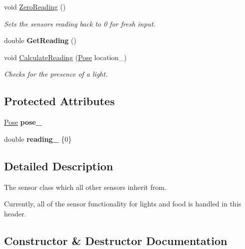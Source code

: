 \begin{DoxyCompactItemize}
\item 
void \hyperlink{classSensor_a2d3fbd7ba1b1dbbe4b3916aa8ce538ea}{Zero\+Reading} ()\hypertarget{classSensor_a2d3fbd7ba1b1dbbe4b3916aa8ce538ea}{}\label{classSensor_a2d3fbd7ba1b1dbbe4b3916aa8ce538ea}

\begin{DoxyCompactList}\small\item\em Sets the sensor\textquotesingle{}s reading back to 0 for fresh input. \end{DoxyCompactList}\item 
double {\bfseries Get\+Reading} ()\hypertarget{classSensor_a70a1a78b3875502d3a2e7a7ba2416903}{}\label{classSensor_a70a1a78b3875502d3a2e7a7ba2416903}

\item 
void \hyperlink{classSensor_a11136e330f87ec24deb0b8dc0abb7824}{Calculate\+Reading} (\hyperlink{structPose}{Pose} location\+\_\+)
\begin{DoxyCompactList}\small\item\em Checks for the presence of a light. \end{DoxyCompactList}\end{DoxyCompactItemize}
\subsection*{Protected Attributes}
\begin{DoxyCompactItemize}
\item 
\hyperlink{structPose}{Pose} {\bfseries pose\+\_\+}\hypertarget{classSensor_ad060f21909f3e4f5dfd310cb2fa52000}{}\label{classSensor_ad060f21909f3e4f5dfd310cb2fa52000}

\item 
double {\bfseries reading\+\_\+} \{0\}\hypertarget{classSensor_ad71b1c465eae9ddf1da31cff1cbe3736}{}\label{classSensor_ad71b1c465eae9ddf1da31cff1cbe3736}

\end{DoxyCompactItemize}


\subsection{Detailed Description}
The sensor class which all other sensors inherit from. 

Currently, all of the sensor functionality for lights and food is handled in this header. 

\subsection{Constructor \& Destructor Documentation}
